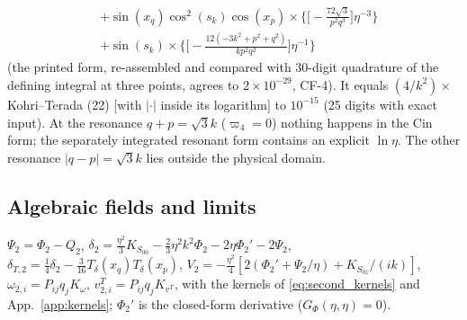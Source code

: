 {\begin{align*}
&+\sin{\left(x_{q} \right)} \cos^{2}{\left(s_{k} \right)} \cos{\left(x_{p} \right)}\times\Big\{\Big[- \frac{72 \sqrt{3}}{p^{2} q^{3}}\Big]\eta^{-3}\Big\}\\
&+\sin{\left(s_{k} \right)}\times\Big\{\Big[- \frac{12 \left(- 3 k^{2} + p^{2} + q^{2}\right)}{k p^{2} q^{2}}\Big]\eta^{-1}\Big\}
\end{align*}
(the printed form, re-assembled and compared with 30-digit quadrature of the defining integral at three points, agrees to $2\times10^{-29}$, CF-4).
It equals $(4/k^2)\times$ Kohri--Terada (22) [with $|\cdot|$ inside its logarithm] to $10^{-15}$ (25 digits with exact input).  At the resonance
$q+p=\sqrt3k$ ($\varpi_4=0$) nothing happens in the $\mathrm{Cin}$ form; the separately integrated resonant form contains an explicit $\ln\eta$.  The
other resonance $|q-p|=\sqrt3k$ lies outside the physical domain.

\subsection*{Algebraic fields and limits}
$\Psi_2=\Phi_2-Q_2$, $\delta_2=\tfrac{\eta^2}3K_{S_{00}}-\tfrac23\eta^2k^2\Phi_2-2\eta\Phi_2'-2\Psi_2$, $\delta_{T,2}=\tfrac14\delta_2-\tfrac3{16}T_\delta(x_q)T_\delta(x_p)$,
$V_2=-\tfrac{\eta^2}4[2(\Phi_2'+\Psi_2/\eta)+K_{S_{0z}}/(ik)]$, $\omega_{2,i}=P_{ij}q_jK_\omega$, $v^T_{2,i}=P_{ij}q_jK_{v^T}$, with the kernels of
\eqref{eq:second_kernels} and App.~\ref{app:kernels}; $\Phi_2'$ is the closed-form derivative ($G_\Phi(\eta,\eta)=0$).

}

